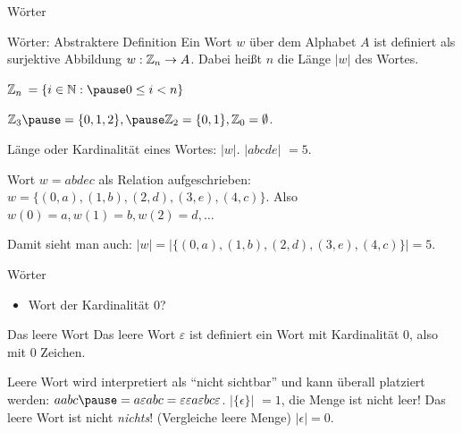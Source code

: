 \begin{frame}{Wörter}
	\pause
	\begin{block}{Wörter: Abstraktere Definition}
		Ein Wort $w$ \pause über dem Alphabet $A$ \pause ist definiert als surjektive Abbildung \pause $w : \mathbb{Z}_n \rightarrow A$. \pause Dabei heißt $n$ \pause die Länge $|w|$ des Wortes.
	\end{block}

	\begin{itemize}
		\pitem $\mathbb{Z}_n$ \pause $ = \{i \in \N : \pause 0 \leq i < n \}$
		
		\pause $\Z_3 \pause = \{0, 1, 2\}, \pause \Z_2 = \{0, 1\}, \Z_0 = \emptyset$.
		
		\pitem Länge oder Kardinalität eines Wortes: \pause $|w|$. \pause $|abcde|$ \pause $= 5$.
		
		\pitem Wort $w = abdec$ als Relation aufgeschrieben: \pause $w = \{(0, a), (1, b), (2, d), (3, e), (4, c)\}$. \pause Also $w(0) = a, w(1) = b, w(2) = d, \dots$
		
		\pause Damit sieht man auch: $|w| = |\{(0, a), (1, b), (2, d), (3, e), (4, c)\}| = 5$.
	\end{itemize}
\end{frame}

\begin{frame}{Wörter}
	\pause
	\begin{itemize}
		\item Wort der Kardinalität 0?
	\end{itemize}

	\pause

	\begin{block}{Das leere Wort}
		Das leere Wort \pause $\varepsilon$ \pause ist definiert ein Wort mit Kardinalität 0\pause , also mit 0 Zeichen.
	\end{block}

	\begin{itemize}
		\pitem Leere Wort wird interpretiert als ``nicht sichtbar'' und kann überall platziert werden\pause : $aabc \pause = a\epsilon abc = \epsilon\epsilon a\epsilon bc \epsilon$.
		\pitem $|\{\epsilon\}|$ \pause $ = 1$\pause , die Menge ist nicht leer! \pause Das leere Wort ist nicht \emph{nichts}! \pause (Vergleiche leere Menge)
		\pitem $|\epsilon| = 0$.
	\end{itemize}
\end{frame}

